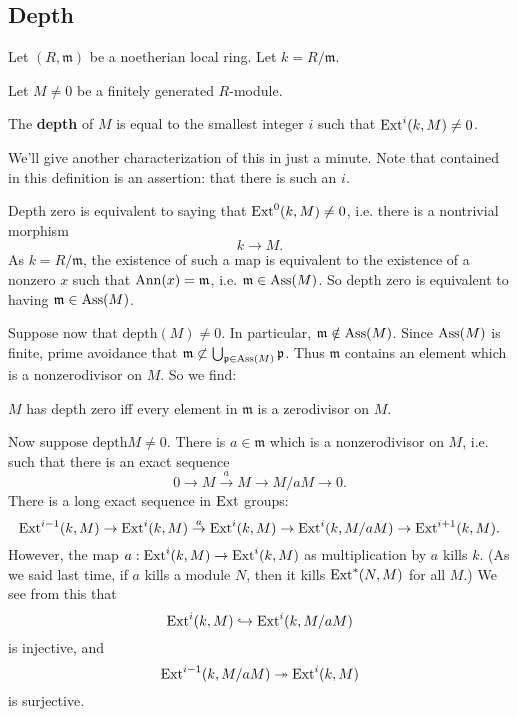 \subsection{Depth} Let $(R, \mathfrak{m})$ be  a noetherian
local ring. Let $k = R/\mathfrak{m}$. 

Let $M \neq 0$ be a finitely generated $R$-module. 

\newcommand{\depth}{\mathrm{depth}}
\begin{definition} 
The \textbf{depth} of $M$ is equal to the smallest integer $i$
such that
$\mathrm{Ext}^i(k,M) \neq 0$.
\end{definition} 

We'll give another characterization of this in just a minute.
Note that
contained in this definition is an assertion: that there is such
an $i$.

\begin{example} 
Depth zero is equivalent to saying that $\mathrm{Ext}^0(k,M) \neq 0$,
i.e. there is a
nontrivial morphism
\[ k \to M.  \]
As $k = R/\mathfrak{m}$, the existence of such a map is
equivalent to the existence of a nonzero $x$
such that $\operatorname{Ann}(x) = \mathfrak{m}$, i.e. $\mathfrak{m} \in
\operatorname{Ass}(M)$. So depth
zero is equivalent to having $\mathfrak{m} \in \operatorname{Ass}(M)$.
\end{example} 

Suppose now that $\depth(M) \neq 0$. In particular,
$\mathfrak{m} \notin
\operatorname{Ass}(M)$. Since $\operatorname{Ass}(M)$ is finite, prime avoidance that
$\mathfrak{m}
\not\subset \bigcup_{\mathfrak{p} \in \operatorname{Ass}(M)} \mathfrak{p}$.
Thus
$\mathfrak{m}$ contains an element which is a nonzerodivisor on
$M$. So we find:

\begin{proposition} 
$M$ has depth zero iff every element in $\mathfrak{m}$ is a
zerodivisor on $M$.
\end{proposition} 

Now suppose $\depth M \neq 0$. There is $a \in \mathfrak{m}$
which is a
nonzerodivisor on $M$, i.e.  such that there is
an exact sequence
\[ 0 \to M \stackrel{a}{\to} M \to M/aM \to 0.  \]
There is a long exact sequence in $\mathrm{Ext}$ groups:
\[\mathrm{Ext}^{i-1}(k,M) \to \mathrm{Ext}^i(k,M) \stackrel{a}{\to} \mathrm{Ext}^i(k,M)
\to \mathrm{Ext}^i(k,
M/aM) \to \mathrm{Ext}^{i+1}(k,M)  .\]
However, the map $a: \mathrm{Ext}^i(k,M) \to \mathrm{Ext}^i(k,M)$ as
multiplication by $a$
kills $k$. (As we said last time, if $a$ kills a module $N$,
then it kills
$\mathrm{Ext}^*(N,M)$ for all $M$.) We see from this that
\[ \mathrm{Ext}^i(k,M) \hookrightarrow \mathrm{Ext}^i(k,M/aM)  \]
is injective, and 
\[ \mathrm{Ext}^{i-1}(k, M/aM) \twoheadrightarrow \mathrm{Ext}^i(k,M)  \]
is surjective.

